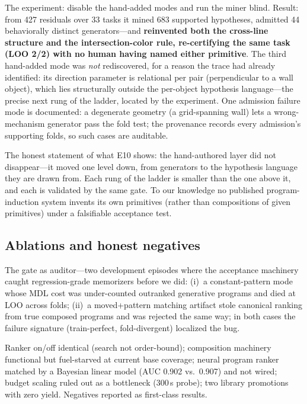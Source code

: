 \documentclass[11pt]{article}
\begin{document}
The experiment: disable the hand-added modes and run the miner blind.
Result: from 427 residuals over 33 tasks it mined 683 supported
hypotheses, admitted 44 behaviorally distinct generators---and
\textbf{reinvented both the cross-line structure and the
intersection-color rule, re-certifying the same task (LOO 2/2) with no
human having named either primitive}.  The third hand-added mode was
\emph{not} rediscovered, for a reason the trace had already identified:
its direction parameter is relational per pair (perpendicular to a wall
object), which lies structurally outside the per-object hypothesis
language---the precise next rung of the ladder, located by the experiment.
One admission failure mode is documented: a degenerate geometry (a
grid-spanning wall) lets a wrong-mechanism generator pass the fold test;
the provenance records every admission's supporting folds, so such cases
are auditable.

The honest statement of what E10 shows: the hand-authored layer did not
disappear---it moved one level down, from generators to the hypothesis
language they are drawn from.  Each rung of the ladder is smaller than the
one above it, and each is validated by the same gate.  To our knowledge no
published program-induction system invents its own primitives (rather than
compositions of given primitives) under a falsifiable acceptance test.

\subsection{Ablations and honest negatives}

The gate as auditor---two development episodes where the acceptance
machinery caught regression-grade memorizers before we did: (i)~a
constant-pattern mode whose MDL cost was under-counted outranked
generative programs and died at LOO across folds; (ii)~a moved+pattern
matching artifact stole canonical ranking from true composed programs and
was rejected the same way; in both cases the failure signature
(train-perfect, fold-divergent) localized the bug.

Ranker on/off identical (search not order-bound); composition machinery
functional but fuel-starved at current base coverage; neural program ranker
matched by a Bayesian linear model (AUC 0.902 vs.\ 0.907) and not wired;
budget scaling ruled out as a bottleneck (300\,s probe); two library
promotions with zero yield.  Negatives reported as first-class results.
\end{document}
